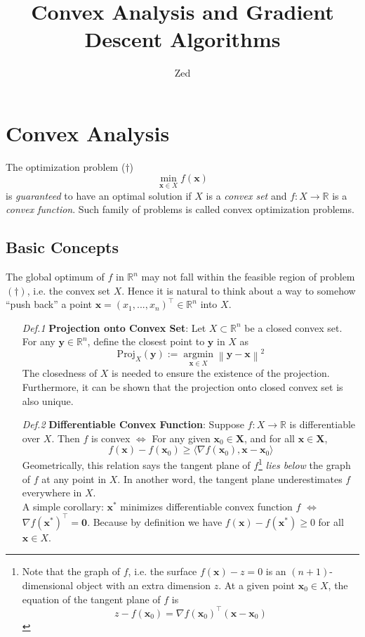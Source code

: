 \documentclass[a4paper, 11pt]{book}
\title{Convex Analysis and Gradient Descent Algorithms}
\author{Zed}
\DeclareMathOperator*{\argmin}{argmin}
\begin{document}
\maketitle

\chapter{Convex Analysis}
The optimization problem ($\dag$)
$$
\min_{\bm{x}\in X} f(\bm{x})
$$ 
is \emph{guaranteed} to have an optimal solution if $X$ is a \emph{convex set} and $f: X\to \mathbb{R}$ is a \emph{convex function}. Such family of problems is called convex optimization problems.
\section{Basic Concepts}
The global optimum of $f$ in $\mathbb{R}^n$ may not fall within the feasible region of problem $(\dag)$, i.e. the convex set $X$. Hence it is natural to think about a way to somehow ``push back'' a point $\bm{x} = (x_1, ..., x_n)^{\top} \in \mathbb{R}^n$ into $X$. 
\begin{itemize}
  \item[\textit{Def.1}] \textbf{Projection onto Convex Set}: Let $X \subset \mathbb{R}^n$ be a closed convex set. For any $\bm{y}\in \mathbb{R}^n$, define the closest point to $\bm{y}$ in $X$ as
  $$
  \text{Proj}_X(\bm{y}) := \argmin\limits_{\bm{x}\in X} \left\|\bm{y}-\bm{x}\right\|^2
  $$
  The closedness of $X$ is needed to ensure the existence of the projection. Furthermore, it can be shown that the projection onto closed convex set is also unique.

  \item[\textit{Def.2}] \textbf{Differentiable Convex Function}: Suppose $f: X\to \mathbb{R}$ is differentiable over $X$. Then $f$ is convex $\iff$ For any given $\bm{x}_0 \in \bm{X}$, and for all $\bm{x}\in \bm{X}$,
  \begin{equation}\label{eq:convexgrad}
    f(\bm{x}) - f(\bm{x}_0) \geq \langle \nabla f(\bm{x}_0), \bm{x-x}_0 \rangle
  \end{equation}
  Geometrically, this relation says the tangent plane of $f$\footnote{Note that the graph of $f$, i.e. the surface $f(\bm{x})-z =0$ is an $(n+1)$-dimensional object with an extra dimension $z$. At a given point $\bm{x}_0 \in X$, the equation of the tangent plane of $f$ is 
  $$
  z - f(\bm{x}_0) = \nabla f(\bm{x}_0)^{\top}(\bm{x} - \bm{x}_0)
  $$
  } \emph{lies below} the graph of $f$ at any point in $X$. In another word, the tangent plane underestimates $f$ everywhere in $X$.\\
  A simple corollary: $\bm{x}^*$ minimizes differentiable convex function $f$ $\iff$ $\nabla f(\bm{x}^*)^{\top} = \bm{0}$. Because by definition we have $f(\bm{x}) - f(\bm{x}^*) \geq 0$ for all $\bm{x}\in X$. 
\end{itemize}
\end{document}
